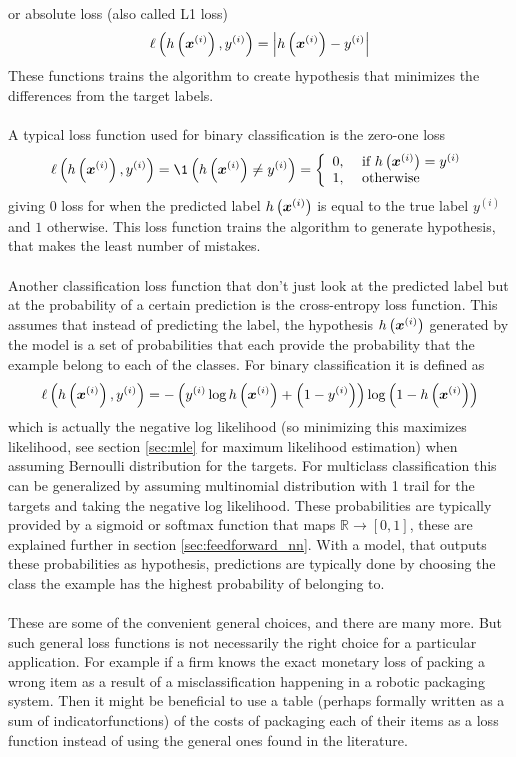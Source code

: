 or absolute loss (also called L1 loss)
$$ \ell\left(h\left (\boldsymbol{x}^{(i)}\right), y^{(i)}\right) = \left |h\left (\boldsymbol{x}^{(i)}\right) - y^{(i)}\right|$$
These functions trains the algorithm to create hypothesis that minimizes the differences from the target labels.
\\
\\
A typical loss function used for binary classification is the zero-one loss 
$$ \ell\left(h\lr{\boldsymbol{x}^{(i)}}, y^{(i)}\right)=\1\left(h\lr{\boldsymbol{x}^{(i)}} \neq y^{(i)} \right)=\left\{\begin{array}{ll}
0, & \text { if } h\lr{\boldsymbol{x}^{(i)}}=y^{(i)} \\
1, & \text { otherwise }
\end{array}\right. $$
giving $0$ loss for when the predicted label $h\left (\boldsymbol{x}^{(i)}\right)$ is equal to the true label $y^{(i)}$ and $1$ otherwise. This loss function trains the algorithm to generate hypothesis, that makes the least number of mistakes. 
\\
\\
Another classification loss function that don't just look at the predicted label but at the probability of a certain prediction is the cross-entropy loss function. This assumes that instead of predicting the label, the hypothesis $h\left (\boldsymbol{x}^{(i)}\right)$ generated by the model is a set of probabilities that each provide the probability that the example belong to each of the classes. For binary classification it is defined as
\begin{equation*}
    \ell\left(h\left (\boldsymbol{x}^{(i)}\right), y^{(i)} \right) = - \left (y^{(i)} \log h\left (\boldsymbol{x}^{(i)}\right) + \left (1 - y^{(i)}\right)\right) \log \left (1 - h\left (\boldsymbol{x}^{(i)}\right)\right)
\end{equation*}
which is actually the negative log likelihood (so minimizing this maximizes likelihood, see section \ref{sec:mle} for maximum likelihood estimation) when assuming Bernoulli distribution for the targets. For multiclass classification this can be generalized by assuming multinomial distribution with 1 trail for the targets and taking the negative log likelihood. These probabilities are typically provided by a sigmoid or softmax function that maps $\mathbb{R} \rightarrow [0,1]$, these are explained further in section \ref{sec:feedforward_nn}. With a model, that outputs these probabilities as hypothesis, predictions are typically done by choosing the class the example has the highest probability of belonging to.
\\
\\
These are some of the convenient general choices, and there are many more. But such general loss functions is not necessarily the right choice for a particular application. For example if a firm knows the exact monetary loss of packing a wrong item as a result of a misclassification happening in a robotic packaging system. Then it might be beneficial to use a table (perhaps formally written as a sum of indicatorfunctions) of the costs of packaging each of their items as a loss function instead of using the general ones found in the literature.



